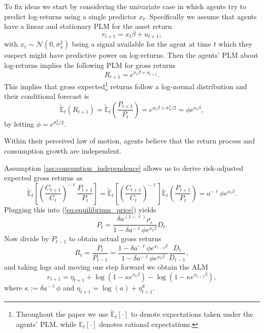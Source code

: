 To fix ideas we start by considering the univariate case in which agents try to predict log-returns using a single predictor $x_t$.
Specifically we assume that agents have a linear and stationary PLM for the asset return
\begin{equation}\label{eq:plm_univariate}
    r_{t+1} =  x_{t} \beta + u_{t+1},
\end{equation}
with $x_t \sim \mathcal{N}(0, \sigma^2_x)$ being a signal available for the agent at time $t$ which they suspect might have predictive power on log-returns.
Then the agents' PLM about log-returns implies the following PLM for gross returns
\begin{equation}
    R_{t+1} = e ^ {x_{t} \beta + u_{t+1}}.
\end{equation}
This implies that gross expected\footnote{
Throughout the paper we use $\tilde{\mathbb{E}}_t[\cdot]$ to denote expectations taken under the agents' PLM, while $\mathbb{E}_t[\cdot]$ denotes rational expectations.}
 returns follow a log-normal distribution and their conditional forecast is
\begin{equation}
    \tilde{\mathbb{E}}_t(R_{t+1}) = \tilde{\mathbb{E}}_t\left(\frac{P_{t+1}}{P_t}\right) = e^{x_{t} \beta + \sigma^2_u / 2} = \phi e^{x_{t} \beta},   
\end{equation}
by letting $\phi = e^{\sigma^2_u / 2}$.

\begin{assumption}\label{ass:consumtion_independence}
    Within their perceived law of motion, agents believe that the return process and consumption growth are independent.
\end{assumption}
Assumption \ref{ass:consumtion_independence} allows us to derive risk-adjusted expected gross returns as
\begin{equation}
    \tilde{\mathbb{E}}_t \left[\left( \frac{C_{t+1}}{C_t}\right)^{- \ell} \frac{P_{t+1}}{P_t} \right] = \tilde{\mathbb{E}}_t \left[\left( \frac{C_{t+1}}{C_t}\right)^{- \ell} \right] \tilde{\mathbb{E}}_t\left(\frac{P_{t+1}}{P_t}\right) = a ^ {-\ell} \phi e^{x_t \beta}.
\end{equation}
Plugging this into (\ref{eq:equilibrium_price}) yields
\begin{equation}
    P_t = \frac{\delta a^{(1 - \ell)} \rho_e}{1 - \delta a^{- \ell} \phi e^{x_t \beta}} D_t.
\end{equation} 
Now divide by $P_{t-1}$ to obtain actual gross returns
\begin{equation}
    R_{t} = \frac{P_{t}}{P_{t-1}} = \frac{1 - \delta a^{- \ell} \phi e^{x_{t-1} \beta}}{1 - \delta a^{- \ell} \phi e^{x_{t} \beta}} \frac{D_t}{D_{t-1}},
\end{equation}
and taking logs and moving one step forward we obtain the ALM 
\begin{equation}\label{eq:alm_univariate}
    r_{t+1} = \eta_{t+1} + \log(1 - \kappa e^{x_{t} \beta}) - \log(1 - \kappa e^{x_{t+1} \beta}),
\end{equation}
where $\kappa := \delta a^{- \ell} \phi$ and $\eta_{t+1} = \log(a) + \eta^d_{t+1}$.

